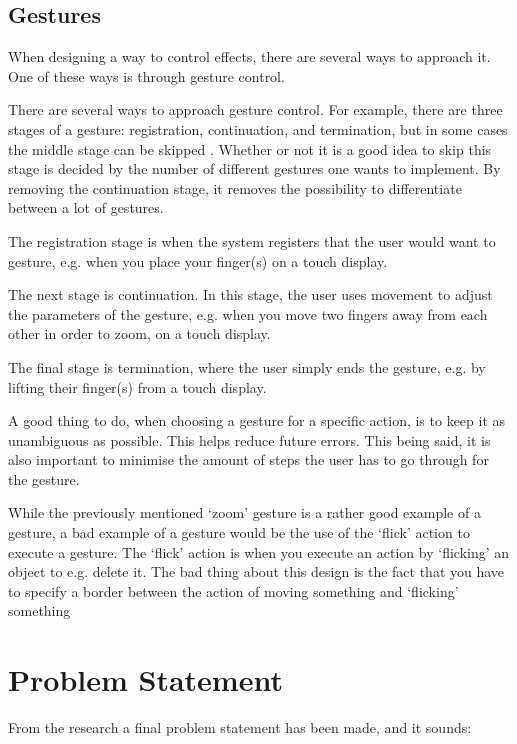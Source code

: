 
\subsection{Gestures}
When designing a way to control effects, there are several ways to approach it. One of these ways is through gesture control.

There are several ways to approach gesture control. For example, there are three stages of a gesture: registration, continuation, and termination, but in some cases the middle stage can be skipped \citep[pp. 127-134]{Wigdor_2011}. Whether or not it is a good idea to skip this stage is decided by the number of different gestures one wants to implement. By removing the continuation stage, it removes the possibility to differentiate between a lot of gestures.


The registration stage is when the system registers that the user would want to gesture, e.g. when you place your finger(s) on a touch display. 

The next stage is continuation. In this stage, the user uses movement to adjust the parameters of the gesture, e.g. when you move two fingers away from each other in order to zoom, on a touch display.

The final stage is termination, where the user simply ends the gesture, e.g. by lifting their finger(s) from a touch display.

A good thing to do, when choosing a gesture for a specific action, is to keep it as unambiguous as possible. This helps reduce future errors. This being said, it is also important to minimise the amount of steps the user has to go through for the gesture.

While the previously mentioned ‘zoom’ gesture is a rather good example of a gesture, a bad example of a gesture would be the use of the ‘flick’ action to execute a gesture. The ‘flick’ action is when you execute an action by ‘flicking’ an object to e.g. delete it. The bad thing about this design is the fact that you have to specify a border between the action of moving something and ‘flicking’ something



\section{Problem Statement}
From the research a final problem statement has been made, and it sounds:\\

